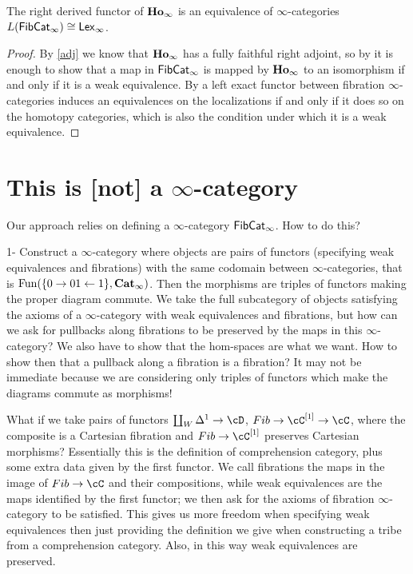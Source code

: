 \documentclass[a4paper,12pt]{scrartcl}
\begin{document}
\begin{prop}
  The right derived functor of $\operatorname{\mathbf{Ho}_\infty}$ is an equivalence of $\infty$-categories
  $L(\operatorname{\mathsf{FibCat}}_\infty)\cong\operatorname{\mathsf{Lex}_\infty}$.
\end{prop}
\begin{proof}
  By \ref{adj} we know that $\operatorname{\mathbf{Ho}_\infty}$ has a fully faithful right adjoint, so by
  \cite[Prop.\ 7.1.18]{Cis19} it is enough to show that a map in
  $\operatorname{\mathsf{FibCat}}_\infty$ is mapped by $\operatorname{\mathbf{Ho}_\infty}$ to an isomorphism if and only if it is a
  weak equivalence. By \cite[Prop.\ 7.6.11]{Cis19} a left exact functor between
  fibration $\infty$-categories induces an equivalences on the localizations if
  and only if it does so on the homotopy categories, which is also the condition
  under which it is a weak equivalence.
\end{proof}

\section{This is [not] a \texorpdfstring{$\infty$}{∞}-category}

Our approach relies on defining a $\infty$-category $\operatorname{\mathsf{FibCat}}_\infty$. How to do this?

1- Construct a $\infty$-category where objects are pairs of functors (specifying weak equivalences and fibrations) with the same codomain between $\infty$-categories, that is $\operatorname{Fun}(\{0\rightarrow 01\leftarrow 1\},\operatorname{\mathbf{Cat}}_\infty)$. Then the morphisms are triples of functors making the proper diagram commute. We take the full subcategory of objects satisfying the axioms of a $\infty$-category with weak equivalences and fibrations, but how can we ask for pullbacks along fibrations to be preserved by the maps in this $\infty$-category? We also have to show that the hom-spaces are what we want. How to show then that a pullback along a fibration is a fibration? It may not be immediate because we are considering only triples of functors which make the diagrams commute as morphisms!

What if we take pairs of functors $\coprod_W\Delta^1\rightarrow\cD$,
$Fib\rightarrow\cC^{[1]}\rightarrow\cC$, where the composite is a Cartesian
fibration and $Fib\rightarrow\cC^{[1]}$ preserves Cartesian morphisms?
Essentially this is the definition of comprehension category, plus some extra
data given by the first functor. We call fibrations the maps in the image of
$Fib\rightarrow\cC$ and their compositions, while weak equivalences are the
maps identified by the first functor; we then ask for the axioms of fibration
$\infty$-category to be satisfied. This gives us more freedom when specifying
weak equivalences then just providing the definition we give when constructing a
tribe from a comprehension category. Also, in this way weak equivalences are
preserved.
\end{document}
